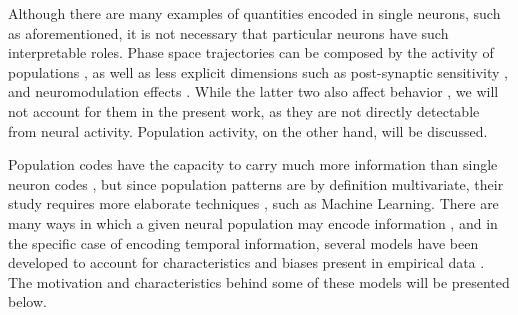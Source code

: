     Although there are many examples of quantities encoded in single neurons, such as aforementioned, it is not necessary that particular neurons have such interpretable roles. Phase space trajectories can be composed by the activity of populations \cite{shamir2014emerging, quiroga2009extracting}, as well as less explicit dimensions such as post-synaptic sensitivity \cite{motanis2018short}, and neuromodulation effects \cite{friston2009free, friston2010free}. While the latter two also affect behavior \cite{wolff2017dynamic}, we will not account for them in the present work, as they are not directly detectable from neural activity. Population activity, on the other hand, will be discussed.
    
    Population codes have the capacity to carry much more information than single neuron codes \cite{hardy2016neurocomputational}, but since population patterns are by definition multivariate, their study requires more elaborate techniques \cite{quiroga2009extracting}, such as Machine Learning. There are many ways in which a given neural population may encode information \cite{quiroga2009extracting, shamir2014emerging, mello2015scalable}, and in the specific case of encoding temporal information, several models have been developed to account for characteristics and biases present in empirical data \cite{hardy2016neurocomputational}. The motivation and characteristics behind some of these models will be presented below.
    